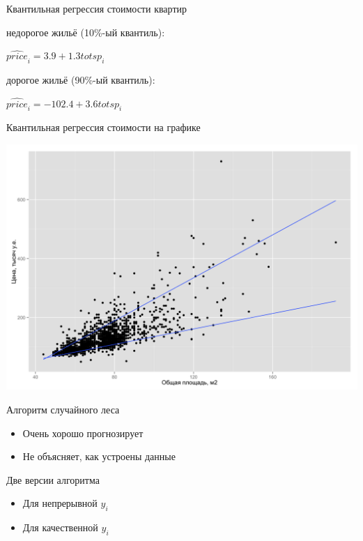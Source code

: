 \documentclass[ignorenonframetext,]{beamer}
\begin{document}
\begin{frame}{Квантильная регрессия стоимости квартир}

недорогое жильё (10\%-ый квантиль):

\(\widehat{price}_i = 3.9 + 1.3 totsp_i\)

дорогое жильё (90\%-ый квантиль):

\(\widehat{price}_i = -102.4 + 3.6 totsp_i\)

\end{frame}

\begin{frame}{Квантильная регрессия стоимости на графике}

\includegraphics{base_q.png}

\end{frame}

\begin{frame}{Алгоритм случайного леса}

\begin{itemize}
\item
  Очень хорошо прогнозирует
\item
  Не объясняет, как устроены данные
\end{itemize}

\end{frame}

\begin{frame}{Две версии алгоритма}

\begin{itemize}
\item
  Для непрерывной \(y_i\)
\item
  Для качественной \(y_i\)
\end{itemize}

\end{frame}
\end{document}
